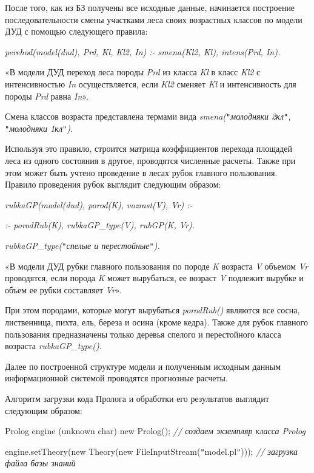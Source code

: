 \documentclass{article}
\begin{document}
После того, как из БЗ получены все исходные 
данные, начинается построение последовательности 
смены участками леса своих возрастных классов 
по модели ДУД с помощью следующего правила:

\textit{perehod(model(dud), Prd, Kl, Kl2, In) :- smena(Kl2, Kl), intens(Prd, In).}

«В модели ДУД переход леса породы \textit{Prd} из 
класса \textit{Kl} в класс \textit{Kl2} с интенсивностью\textit{ 
In }осуществляется, если \textit{Kl2 }сменяет \textit{Kl} 
и интенсивность для породы \textit{Prd} равна \textit{In}».

Смена классов возраста представлена термами 
вида \textit{smena(\texttt{"}молодняки 2кл\texttt{"}, \texttt{"}молодняки 
1кл\texttt{"}).}

Используя это правило, строится матрица коэффициентов 
перехода площадей леса из одного состояния 
в другое, проводятся численные расчеты. Также 
при этом может быть учтено проведение в лесах 
рубок главного пользования. Правило проведения 
рубок выглядит следующим образом:

\begin{center}
\textit{rubkaGP(model(dud), porod(K), vozrast(V), Vr) :-}

\textit{:-  porodRub(K), rubkaGP\_type(V), rubGP(K, Vr).}

\textit{rubkaGP\_type(\texttt{"}спелые и перестойные\texttt{"}).}
\end{center}

«В модели ДУД рубки главного пользования по 
породе \textit{K} возраста \textit{V} объемом \textit{Vr} 
проводятся, если порода \textit{K} может вырубаться, 
ее возраст \textit{V} подлежит вырубке и объем ее 
рубки составляет\textit{ Vr}».

При этом породами, которые могут вырубаться 
\textit{porodRub() }являются все  сосна, лиственница, 
пихта, ель, береза и осина (кроме кедра). Также 
для рубок главного пользования предназначены 
только деревья спелого и перестойного класса 
возраста \textit{rubkaGP\_type()}.

Далее по построенной структуре модели и полученным 
исходным данным информационной системой проводятся 
 прогнозные расчеты. 

Алгоритм загрузки кода Пролога и обработки 
его результатов выглядит следующим образом: 

Prolog engine (unknown char) new Prolog();     \textit{// создаем экземпляр 
класса Prolog}

engine.setTheory(new Theory(new FileInputStream(\texttt{"}model.pl\texttt{"}))); 
\textit{//   загрузка файла базы знаний}
\end{document}
